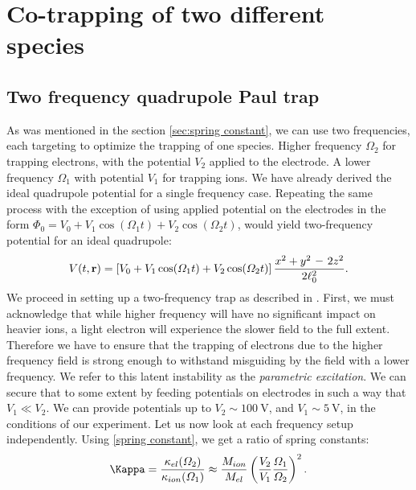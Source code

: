 \chapter{Co-trapping of two different species}
\label{chap:co-trapping}

\section{Two frequency quadrupole Paul trap}
\label{sec:two frequency trap}
As was mentioned in the section \ref{sec:spring constant},
we can use two frequencies, each targeting to optimize the trapping of one species. Higher frequency $\Omega_2$ for trapping electrons, with the potential $V_2$ applied to the electrode. A lower frequency $\Omega_1$ with potential $V_1$ for trapping ions. We have already derived the ideal quadrupole potential for a single frequency case. Repeating the same process with the exception of using applied potential on the electrodes in the form $\Phi_0 = V_0 + V_1 \cos(\Omega_1 t) + V_2 \cos(\Omega_2 t)$, would yield two-frequency potential for an ideal quadrupole:
\begin{equation}
	\label{ideal quadrupole potential two frequency}
	V(t,\vb{r}) = \left[V_0 + V_1 \cos(\Omega_1 t) + V_2 \cos(\Omega_2 t)\right] \dfrac{x^2+y^2 \minus 2z^2}{2\ell_0^2}.
\end{equation}
We proceed in setting up a two-frequency trap as described in \cite{FOOT2018117, trypogeorgos2016cotrapping}. First, we must acknowledge that while higher frequency will have no significant impact on heavier ions, a light electron will experience the slower field to the full extent. Therefore we have to ensure that the trapping of electrons due to the higher frequency field is strong enough to withstand misguiding by the field with a lower frequency. We refer to this latent instability as the \emph{parametric excitation}. We can secure that to some extent by feeding potentials on electrodes in such a way that $V_1 \ll V_2$. We can provide potentials up to $V_2 \sim \SI{100}{\volt}$, and $V_1 \sim \SI{5}{\volt}$, in the conditions of our experiment. Let us now look at each frequency setup independently. Using \eqref{spring constant}, we get a ratio of spring constants:
\begin{equation}
	\label{two frequency ratio}
	\Kappa = \dfrac{\kappa_{el}(\Omega_2)}{\kappa_{ion}(\Omega_1)} \approx \dfrac{M_{ion}}{M_{el}} \left(\dfrac{V_2}{V_1}\dfrac{\Omega_1}{\Omega_2}\right)^2.
\end{equation}
